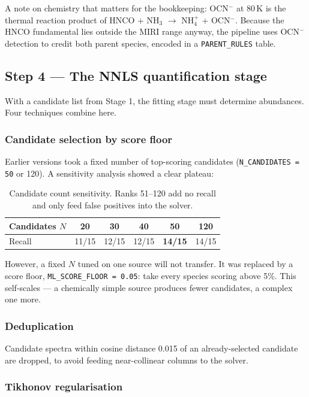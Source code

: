 \documentclass[11pt,a4paper]{article}
\newcommand{\code}[1]{\texttt{\small #1}}
\newcommand{\nhfour}{NH$_4^+$}
\newcommand{\ocn}{OCN$^-$}
\begin{document}
A note on chemistry that matters for the bookkeeping: \ocn{} at 80\,K is
the thermal reaction product of HNCO + NH$_3$ $\rightarrow$ \nhfour{} +
\ocn. Because the HNCO fundamental lies outside the MIRI range anyway, the
pipeline uses \ocn{} detection to credit both parent species, encoded in a
\code{PARENT\_RULES} table.

\subsection{Step 4 --- The NNLS quantification stage}

With a candidate list from Stage 1, the fitting stage must determine
abundances. Four techniques combine here.

\subsubsection*{Candidate selection by score floor}

Earlier versions took a fixed number of top-scoring candidates
(\code{N\_CANDIDATES = 50} or 120). A sensitivity analysis showed a clear
plateau:

\begin{table}[H]
\centering
\small
\begin{tabular}{@{}lccccc@{}}
\toprule
Candidates $N$ & 20 & 30 & 40 & 50 & 120 \\
\midrule
Recall & 11/15 & 12/15 & 12/15 & \textbf{14/15} & 14/15 \\
\bottomrule
\end{tabular}
\caption{Candidate count sensitivity. Ranks 51--120 add no recall and only
feed false positives into the solver.}
\end{table}

However, a fixed $N$ tuned on one source will not transfer. It was replaced
by a score floor, \code{ML\_SCORE\_FLOOR = 0.05}: take every species
scoring above 5\%. This self-scales --- a chemically simple source produces
fewer candidates, a complex one more.

\subsubsection*{Deduplication}

Candidate spectra within cosine distance 0.015 of an already-selected
candidate are dropped, to avoid feeding near-collinear columns to the
solver.

\subsubsection*{Tikhonov regularisation}
\end{document}
